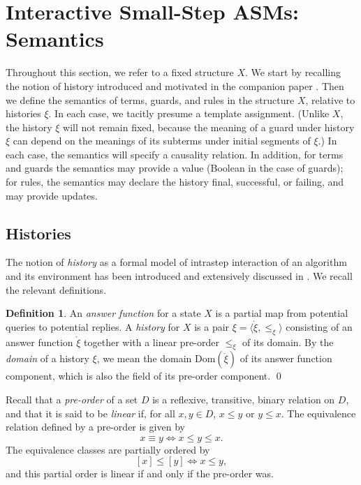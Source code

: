 \documentclass{LMCS}
\theoremstyle{definition}
\newtheorem{df}[thm]{Definition}
\newcommand{\ans}{\dot}
\newcommand{\dom}[1]{\ensuremath{{\text{Dom}}(#1)}}
\newcommand{\sq}[1]{\ensuremath{\langle#1\rangle}}
\begin{document}
\section{Interactive Small-Step ASMs: Semantics}   \label{asm-sem}

Throughout this section, we refer to a fixed structure $X$.  We start by
recalling the notion of history introduced and motivated in the companion
paper \cite{ga1}.  Then we define the semantics of terms, guards, and
rules in the structure $X$, relative to histories $\xi$.  In each case, we
tacitly presume a template assignment.  (Unlike $X$, the history $\xi$
will not remain fixed, because the meaning of a guard under history $\xi$
can depend on the meanings of its subterms under initial segments of
$\xi$.)  In each case, the semantics will specify a causality relation.
In addition, for terms and guards the semantics may provide a value
(Boolean in the case of guards); for rules, the semantics may declare the
history final, successful, or failing, and may provide updates.


\subsection{Histories}

The notion of \emph{history} as a formal model of intrastep interaction of
an algorithm and its environment has been introduced and extensively
discussed in \cite{ga1}.  We recall the relevant definitions.

\begin{df}       \label{ans-fn}
An \emph{answer function} for a state $X$ is a partial map from
potential queries to potential replies.  A \emph{history} for $X$ is
a pair $\xi=\sq{\ans\xi,\leq_\xi}$ consisting of an answer function
$\ans\xi$ together with a linear pre-order $\leq_\xi$ of its domain.
By the \emph{domain} of a history $\xi$, we mean the domain
\dom{\ans\xi} of its answer function component, which is also the
field of its pre-order component. \qed\end{df}

Recall that a \emph{pre-order} of a set $D$ is a reflexive,
transitive, binary relation on $D$, and that it is said to be
\emph{linear} if, for all $x,y\in D$, $x\leq y$ or $y\leq x$.  The
equivalence relation defined by a pre-order is given by
$$
x\equiv y\iff x\leq y\leq x.
$$
The equivalence classes are partially ordered by
$$
[x]\leq[y]\iff x\leq y,
$$
and this partial order is linear if and only if the pre-order was.
\end{document}
